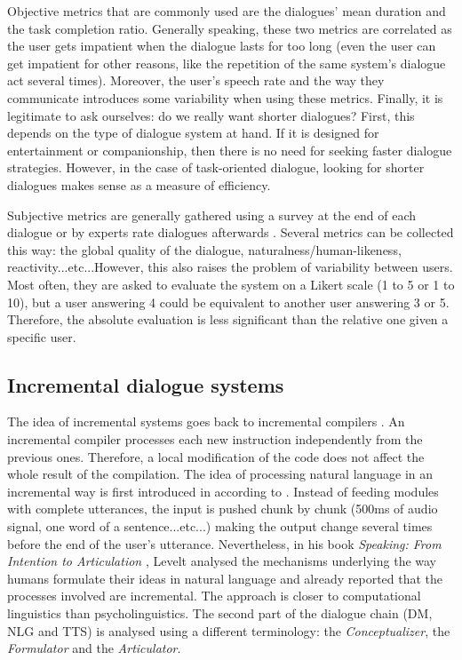 		Objective metrics that are commonly used are the dialogues' mean duration and the task completion ratio. Generally speaking, these two metrics are correlated as the user gets impatient when the dialogue lasts for too long (even the user can get impatient for other reasons, like the repetition of the same system's dialogue act several times). Moreover, the user's speech rate and the way they communicate introduces some variability when using these metrics. Finally, it is legitimate to ask ourselves: do we really want shorter dialogues? First, this depends on the type of dialogue system at hand. If it is designed for entertainment or companionship, then there is no need for seeking faster dialogue strategies. However, in the case of task-oriented dialogue, looking for shorter dialogues makes sense as a measure of efficiency.

		Subjective metrics are generally gathered using a survey at the end of each dialogue or by experts rate dialogues afterwards \cite{El-Asri2014b}. Several metrics can be collected this way: the global quality of the dialogue, naturalness/human-likeness, reactivity...etc...However, this also raises the problem of variability between users. Most often, they are asked to evaluate the system on a Likert scale (1 to 5 or 1 to 10), but a user answering 4 could be equivalent to another user answering 3 or 5. Therefore, the absolute evaluation is less significant than the relative one given a specific user.

	\subsection{Incremental dialogue systems}
    
		The idea of incremental systems goes back to incremental compilers \cite{Lock1965}. An incremental compiler processes each new instruction independently from the previous ones. Therefore, a local modification of the code does not affect the whole result of the compilation. The idea of processing natural language in an incremental way is first introduced in \cite{Wiren1992} according to \cite{Kilger1995}. Instead of feeding modules with complete utterances, the input is pushed chunk by chunk (500ms of audio signal, one word of a sentence...etc...) making the output change several times before the end of the user's utterance. Nevertheless, in his book \textit{Speaking: From Intention to Articulation} \cite{Levelt1989}, Levelt analysed the mechanisms underlying the way humans formulate their ideas in natural language and already reported that the processes involved are incremental. The approach is closer to computational linguistics than psycholinguistics. The second part of the dialogue chain (DM, NLG and TTS) is analysed using a different terminology: the \textit{Conceptualizer}, the \textit{Formulator} and the \textit{Articulator}.

